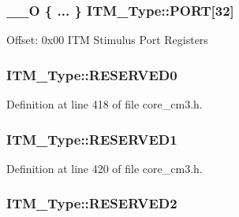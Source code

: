 \subsubsection[{\texorpdfstring{P\+O\+RT}{PORT}}]{\setlength{\rightskip}{0pt plus 5cm}\+\_\+\+\_\+O \{ ... \}    I\+T\+M\+\_\+\+Type\+::\+P\+O\+RT\mbox{[}32\mbox{]}}\hypertarget{struct_i_t_m___type_ab1afbd0238eb66b5da3397b943e2669b}{}\label{struct_i_t_m___type_ab1afbd0238eb66b5da3397b943e2669b}
Offset\+: 0x00 I\+TM Stimulus Port Registers 
\subsubsection[{\texorpdfstring{R\+E\+S\+E\+R\+V\+E\+D0}{RESERVED0}}]{ I\+T\+M\+\_\+\+Type\+::\+R\+E\+S\+E\+R\+V\+E\+D0}\hypertarget{struct_i_t_m___type_a8a7ae8e70370c3b26d19fd327d9dcb4d}{}\label{struct_i_t_m___type_a8a7ae8e70370c3b26d19fd327d9dcb4d}


Definition at line 418 of file core\+\_\+cm3.\+h.

\subsubsection[{\texorpdfstring{R\+E\+S\+E\+R\+V\+E\+D1}{RESERVED1}}]{ I\+T\+M\+\_\+\+Type\+::\+R\+E\+S\+E\+R\+V\+E\+D1}\hypertarget{struct_i_t_m___type_ac9cd5e2de58b106e60c071fde97df796}{}\label{struct_i_t_m___type_ac9cd5e2de58b106e60c071fde97df796}


Definition at line 420 of file core\+\_\+cm3.\+h.

\subsubsection[{\texorpdfstring{R\+E\+S\+E\+R\+V\+E\+D2}{RESERVED2}}]{ I\+T\+M\+\_\+\+Type\+::\+R\+E\+S\+E\+R\+V\+E\+D2}\hypertarget{struct_i_t_m___type_a043ed85023380f4b8a84cb234648758f}{}\label{struct_i_t_m___type_a043ed85023380f4b8a84cb234648758f}


